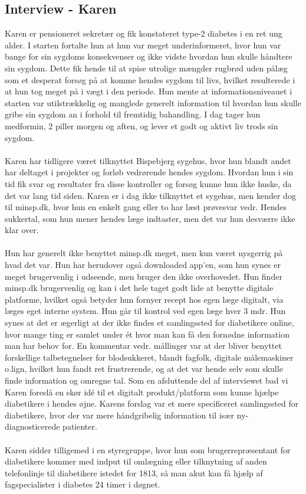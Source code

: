 \subsection{Interview - Karen}
Karen er pensioneret sekretær og fik konstateret type-2 diabetes i en ret ung alder. I starten fortalte hun at hun var meget underinformeret, hvor hun var bange for sin sygdoms konsekvenser og ikke vidste hvordan hun skulle håndtere sin sygdom. Dette fik hende til at spise utrolige mængder rugbrød uden pålæg som et desperat forsøg på at komme hendes sygdom til livs, hvilket resulterede i at hun tog meget på i vægt i den periode. Hun mente at informationsniveauet i starten var utilstrækkelig og manglede generelt information til hvordan hun skulle gribe sin sygdom an i forhold til fremtidig bahandling. I dag tager hun medformin, 2 piller morgen og aften, og lever et godt og aktivt liv trods sin sygdom.
\\ \\
Karen har tidligere været tilknyttet Bispebjerg sygehus, hvor hun blandt andet har deltaget i projekter og forløb vedrørende hendes sygdom. Hvordan hun i sin tid fik svar og resultater fra disse kontroller og forsøg kunne hun ikke huske, da det var lang tid siden. Karen er i dag ikke tilknyttet et sygehus, men kender dog til minsp.dk, hvor hun en enkelt gang eller to har læst prøvesvar vedr. Hendes sukkertal, som hun mener hendes læge indtaster, men det var hun desværre ikke klar over. 
\\ \\
Hun har generelt ikke benyttet minsp.dk meget, men kun været nysgerrig på hvad det var. Hun har herudover også downloaded app'en, som hun synes er meget brugervenlig i udseende, men bruger den ikke overhovedet. Hun finder minsp.dk brugervenlig og kan i det hele taget godt lide at benytte digitale platforme, hvilket også betyder hun fornyer recept hos egen læge digitalt, via læges eget interne system. Hun går til kontrol ved egen læge hver 3 mdr. Hun synes at det er ægerligt at der ikke findes et samlingssted for diabetikere online, hvor mange ting er samlet under ét hvor man kan få den fornødne information man har behov for. En kommentar vedr. mållinger var at der bliver benyttet forskellige talbetegnelser for blodsukkeret, blandt fagfolk, digitale målemaskiner o.lign, hvilket hun fandt ret frustrerende, og at det var hende selv som skulle finde information og omregne tal. 
Som en afsluttende del af interviewet bad vi Karen foreslå en skør idé til et digitalt produkt/platform som kunne hjælpe diabetikere i hendes øjne. Karens forslag var et mere specificeret samlingssted for diabetikere, hvor der var mere håndgribelig information til især ny-diagnosticerede patienter.
\\ \\
Karen sidder tilligemed i en styregruppe, hvor hun som brugerrepræsentant for diabetikere kommer med indput til omlægning eller tilknytning af anden telefonlinje til diabetikere istedet for 1813, så man akut kan få hjælp af fagspecialister i diabetes 24 timer i døgnet.

